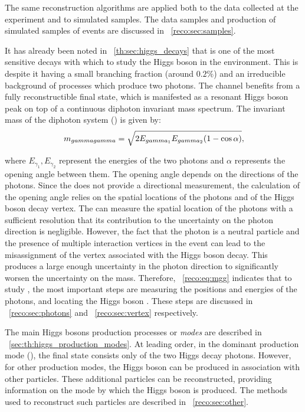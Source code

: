 The same reconstruction algorithms are applied both to the data collected at the \CMS experiment and to simulated samples. %
The data samples and production of simulated samples of \MC events are discussed in \Sec~\ref{reco:sec:samples}.


It has already been noted in \Sec~\ref{th:sec:higgs_decays} that \Hgg is one of the most sensitive decays with which to study the Higgs boson in the \LHC environment. This is despite it having a small branching fraction (around $0.2\%$) and an irreducible background of \SM processes which produce two photons. The channel benefits from a fully reconstructible final state, which is manifested as a resonant Higgs boson peak on top of a continuous diphoton invariant mass spectrum.
The invariant mass of the diphoton system (\mgg) is given by:
\begin{equation}
\label{reco:eq:mgg}
 \,m_{gammagamma} = \sqrt{2 E_{gamma_{1}} E_{gamma_{2}} (1-\cos\alpha)}, 
\end{equation}

where $E_{\gamma_{1}},E_{\gamma_{2}}$ represent the energies of the two photons and $\alpha$ represents the opening angle between them. 
The opening angle depends on the directions of the photons. Since the \CMS \ECAL does not provide a directional measurement, the calculation of the opening angle relies on the spatial locations of the photons and of the Higgs boson decay vertex. The \CMS \ECAL can measure the spatial location of the photons with a sufficient resolution that its contribution to the uncertainty on the photon direction is negligible. However, the fact that the photon is a neutral particle and the presence of multiple interaction vertices in the event can lead to the misassignment of the vertex associated with the Higgs boson decay. This produces a large enough uncertainty in the photon direction to significantly worsen the uncertainty on the mass.
Therefore, \Eq~\ref{reco:eq:mgg} indicates that to study \Hgg, the most important steps are measuring the positions and energies of the photons, and locating the Higgs boson \PV. These steps are discussed in \Sec~\ref{reco:sec:photons} and \Sec~\ref{reco:sec:vertex} respectively. 

The main Higgs bosons production processes or \emph{modes} are described in \Sec~\ref{sec:th:higgs_production_modes}. At leading order, in the dominant production mode (\ggH), the final state consists only of the two Higgs decay photons. However, for other production modes, the Higgs boson can be produced in association with other particles. These additional particles can be reconstructed, providing information on the mode by which the Higgs boson is produced. The methods used to reconstruct such particles are described in \Sec~\ref{reco:sec:other}.

